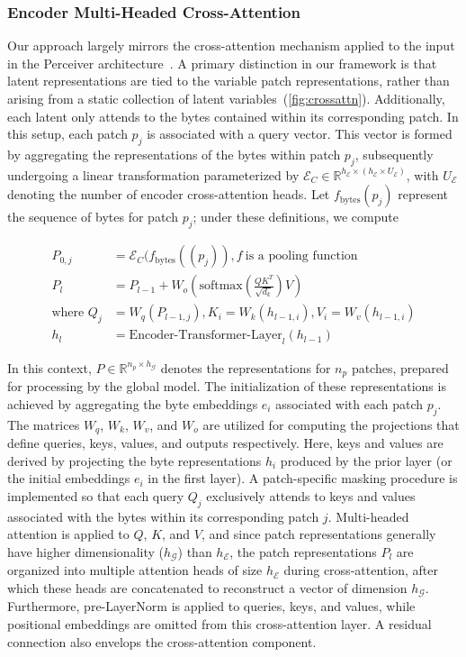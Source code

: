 \subsubsection{Encoder Multi-Headed Cross-Attention}
\label{sec:enc-cross-attn}
Our approach largely mirrors the cross-attention mechanism applied to the input in the Perceiver architecture~\citep{jaegle2021perceiver}. A primary distinction in our framework is that latent representations are tied to the variable patch representations, rather than arising from a static collection of latent variables~(\autoref{fig:crossattn}). Additionally, each latent only attends to the bytes contained within its corresponding patch. In this setup, each patch $p_j$ is associated with a query vector. This vector is formed by aggregating the representations of the bytes within patch $p_j$, subsequently undergoing a linear transformation parameterized by $\mathcal{E}_{C} \in \mathbb{R}^{h_{\mathcal{E}} \times (h_{\mathcal{E}} \times U_{\mathcal{E}})}$, with $U_{\mathcal{E}}$ denoting the number of encoder cross-attention heads. Let $f_{\text{bytes}}(p_j)$ represent the sequence of bytes for patch $p_j$; under these definitions, we compute

\begin{align}
P_{0,j} &= \mathcal{E}_{C}(f_\text{bytes}((p_j)), f~ \text{is a pooling function} \\
P_l &= P_{l-1} + W_o\left(\text{softmax}\left(\frac{QK^T}{\sqrt{d_k}}\right)V\right) \\
\text{where } Q_j &= W_q(P_{l-1,j}), K_i = W_k(h_{l-1,i}), V_i = W_v(h_{l-1,i}) \\
h_l &= \text{Encoder-Transformer-Layer}_l(h_{l-1})
\end{align}

In this context, $P \in \mathbb{R}^{n_p \times h_{\mathcal{G}}}$ denotes the representations for $n_p$ patches, prepared for processing by the global model. The initialization of these representations is achieved by aggregating the byte embeddings $e_i$ associated with each patch $p_j$. The matrices $W_q$, $W_k$, $W_v$, and $W_o$ are utilized for computing the projections that define queries, keys, values, and outputs respectively. Here, keys and values are derived by projecting the byte representations $h_i$ produced by the prior layer (or the initial embeddings $e_i$ in the first layer). A patch-specific masking procedure is implemented so that each query $Q_j$ exclusively attends to keys and values associated with the bytes within its corresponding patch $j$. Multi-headed attention is applied to $Q$, $K$, and $V$, and since patch representations generally have higher dimensionality ($h_{\mathcal{G}}$) than $h_{\mathcal{E}}$, the patch representations $P_l$ are organized into multiple attention heads of size $h_{\mathcal{E}}$ during cross-attention, after which these heads are concatenated to reconstruct a vector of dimension $h_{\mathcal{G}}$. Furthermore, pre-LayerNorm is applied to queries, keys, and values, while positional embeddings are omitted from this cross-attention layer. A residual connection also envelops the cross-attention component.

